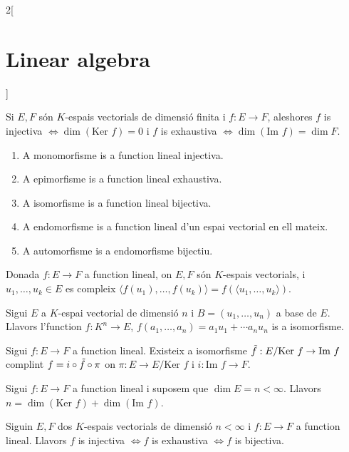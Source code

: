 \documentclass[../../../main.tex]{subfiles}
\begin{document}
\begin{multicols}{2}[\section{Linear algebra}]
\begin{prop}
\begin{enumerate}
\end{enumerate}
\end{prop}
\begin{prop}
Si $E,F$ són $K$-espais vectorials de dimensió finita i $f:E\rightarrow F$, aleshores $f$ is injectiva $\iff \dim(\text{Ker }f)=0$ i $f$ is exhaustiva $\iff \dim(\text{Im }f)=\dim F$.
\end{prop}
\begin{definition}
\hfill
\begin{enumerate}
    \item A monomorfisme is a function lineal injectiva.
    \item A epimorfisme is a function lineal exhaustiva.
    \item A isomorfisme is a function lineal bijectiva.
    \item A endomorfisme is a function lineal d'un espai vectorial en ell mateix.
    \item A automorfisme is a endomorfisme bijectiu.
\end{enumerate}
\end{definition}
\begin{lemma}
Donada $f:E\rightarrow F$ a function lineal, on $E,F$ són $K$-espais vectorials, i $u_1,\ldots,u_k\in E$ es compleix $\langle f(u_1),\ldots,f(u_k)\rangle=f(\langle u_1,\ldots,u_k\rangle)$.
\end{lemma}
\begin{theorem}
Sigui $E$ a $K$-espai vectorial  de dimensió $n$ i $B=(u_1,\ldots,u_n)$ a base de $E$. Llavors l'function $f:K^n\rightarrow E$, $f(a_1,\ldots,a_n)=a_1u_1+\cdots a_nu_n$ is a isomorfisme.
\end{theorem}
\begin{theorem}
Sigui $f:E\rightarrow F$ a function lineal. Existeix a isomorfisme $\Tilde{f}:E/\text{Ker }f\rightarrow \text{Im }f$ complint $f=i\circ\Tilde{f}\circ\pi$ on $\pi:E\rightarrow E/\text{Ker }f$ i $i:\text{Im }f\rightarrow F$.
\end{theorem}
\begin{corollary}
Sigui $f:E\rightarrow F$ a function lineal i suposem que $\dim E=n<\infty$. Llavors $n=\dim(\text{Ker }f)+\dim(\text{Im }f)$.
\end{corollary}
\begin{corollary}
Siguin $E,F$ dos $K$-espais vectorials de dimensió $n<\infty$ i $f:E\rightarrow F$ a function lineal. Llavors $f$ is injectiva $\iff f$ is exhaustiva $\iff f$ is bijectiva.

\end{corollary}
\end{multicols}
\end{document}
